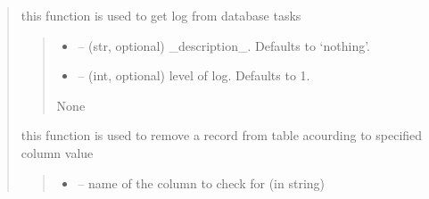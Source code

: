 \documentclass[letterpaper,10pt,english]{sphinxmanual}
\begin{document}
\begin{quote}
\begin{savenotes}
\begin{fulllineitems}
\begin{savenotes}\begin{fulllineitems}
\label{\detokenize{setting/database:oxin.database.dataBase.get_log}}
\pysigstartsignatures
{}
\pysigstopsignatures
\sphinxAtStartPar
this function is used to get log from database tasks
\begin{quote}\begin{description}
\begin{itemize}
\item {} 
\sphinxAtStartPar
{} – (str, optional) \_description\_. Defaults to ‘nothing’.

\item {} 
\sphinxAtStartPar
{} – (int, optional) level of log. Defaults to 1.

\end{itemize}

\sphinxAtStartPar
None

\end{description}\end{quote}

\end{fulllineitems}\end{savenotes}


\begin{savenotes}\begin{fulllineitems}
\label{\detokenize{setting/database:oxin.database.dataBase.remove_record}}
\pysigstartsignatures
{}
\pysigstopsignatures
\sphinxAtStartPar
this function is used to remove a record from table acourding to specified column value
\begin{quote}\begin{description}
\begin{itemize}
\item {} 
\sphinxAtStartPar
{} – name of the column to check for (in string)


\end{itemize}
\end{description}
\end{quote}
\end{fulllineitems}
\end{savenotes}
\end{fulllineitems}
\end{savenotes}
\end{quote}
\end{document}
